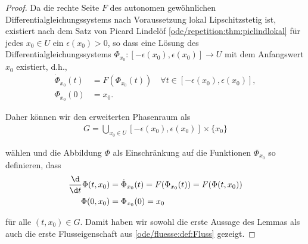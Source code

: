 \documentclass[letterpaper,10pt,english]{jupyterBook}
\begin{document}
\begin{proof}
 Da die rechte Seite \(F\) des autonomen gewöhnlichen Differentialgleichungssystems nach Voraussetzung lokal Lipschitzstetig ist, existiert nach dem Satz von Picard Lindelöf \cref{ode/repetition:thm:piclindlokal} für jedes \(x_0\in U\) ein \(\epsilon(x_0)>0\), so dass eine Lösung des Differentialgleichungssystems \(\Phi_{x_0} \colon [-\epsilon(x_0),\epsilon(x_0)] \rightarrow U\) mit dem Anfangswert \(x_0\) existiert, d.h.,
\begin{align*}
\dot{\Phi}_{x_0}(t) &= F(\Phi_{x_0}(t)) \quad \forall t \in [-\epsilon(x_0),\epsilon(x_0)],\\
\Phi_{x_0}(0) &= x_0.
\end{align*}
\par
Daher können wir den erweiterten Phasenraum als
\begin{align*}
G = \bigcup_{x_0\in U} [-\epsilon(x_0),\epsilon(x_0)] \times\{x_0\}
\end{align*}
\par
wählen und die Abbildung \(\Phi\) als Einschränkung auf die Funktionen \(\Phi_{x_0}\) so definieren, dass
\begin{align*}
\frac{\d}{\d t} \Phi(t, x_0) &= \dot{\Phi}_{x_0}(t) = F(\Phi_{x_0}(t)) = F(\Phi(t, x_0))\\
\Phi(0, x_0) &= \Phi_{x_0}(0) = x_0
\end{align*}
\par
für alle \((t, x_0)\in G\).
Damit haben wir sowohl die erste Aussage des Lemmas als auch die erste Flusseigenschaft aus \cref{ode/fluesse:def:Fluss} gezeigt.


\end{proof}
\end{document}
